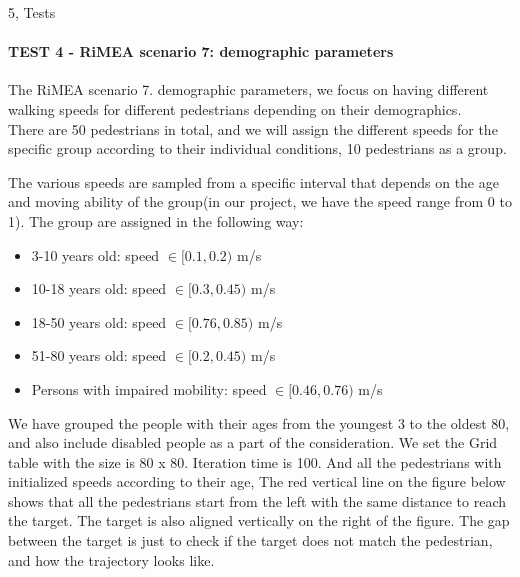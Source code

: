 
\begin{task}{5, Tests}

\paragraph{TEST 4 - RiMEA scenario 7: demographic parameters}

The RiMEA scenario 7. demographic parameters, we focus on having different walking speeds for different pedestrians depending on their demographics.\\ There are 50 pedestrians in total, and we will assign the different speeds for the specific group according to their individual conditions, 10 pedestrians as a group. 

The various speeds are sampled from a specific interval that depends on the age and moving ability of the group(in our project, we have the speed range from 0 to 1). The group are assigned in the following way:
\begin{itemize}
    \item 3-10 years old: speed $\in[0.1, 0.2)$ m/s
    \item 10-18 years old: speed $\in[0.3, 0.45)$ m/s
    \item 18-50 years old: speed $\in[0.76, 0.85)$ m/s
    \item 51-80 years old: speed $\in[0.2, 0.45)$ m/s
    \item Persons with impaired mobility: speed $\in[0.46, 0.76)$ m/s
\end{itemize}
We have grouped the people with their ages from the youngest 3 to the oldest 80, and also include disabled people as a part of the consideration. We set the Grid table with the size is 80 x 80. Iteration time is 100. And all the pedestrians with initialized speeds according to their age, The red vertical line on the figure below shows that all the pedestrians start from the left with the same distance to reach the target. The target is also aligned vertically on the right of the figure. The gap between the target is just to check if the target does not match the pedestrian, and how the trajectory looks like. 
\begin{figure}[H] 
\centering
{}

\end{figure}
\end{task}
